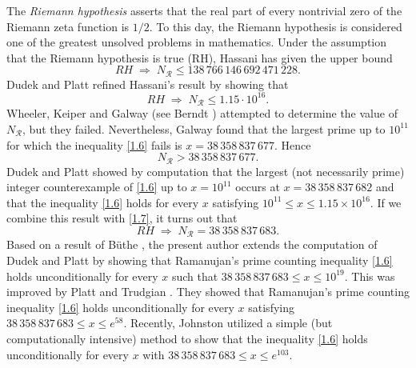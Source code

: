\documentclass[a4paper,12pt]{amsart}
\newcommand{\C}{\mathds{C}}
\theoremstyle{definition}
\theoremstyle{remark}
\begin{document}
The \textit{Riemann hypothesis} asserts that the real part of every nontrivial zero of the Riemann zeta function is $1/2$.
To this day, the Riemann hypothesis is considered one of the greatest unsolved problems in mathematics.
Under the assumption that the Riemann hypothesis is 
true (RH), Hassani \cite[Theorem 1.2]{hassani2012} has given the upper bound 
\begin{displaymath}
RH \; \Rightarrow \; N_{\mathcal{R}} \leq 138\,766\,146\,692\,471\,228.
\end{displaymath}
Dudek and Platt \cite[Lemma 3.2]{dudekplatt} refined Hassani's result by showing that
\begin{equation}
RH \; \Rightarrow \; N_{\mathcal{R}} \leq 1.15 \cdot 10^{16}. \tag{1.7} \label{1.7}
\end{equation}
Wheeler, Keiper and Galway (see Berndt \cite[p.]{berndt1994}) attempted to determine the value of $N_{\mathcal{R}}$, but they failed. Nevertheless, Galway found that 
the largest prime up to $10^{11}$ for which the inequality \eqref{1.6} fails is $x=38\,358\,837\,677$. Hence
\begin{displaymath}
N_{\mathcal{R}} > 38\,358\,837\,677.
\end{displaymath}
Dudek and Platt \cite[Theorem 1.3]{dudekplatt} showed by computation that the largest (not necessarily prime) integer counterexample of \eqref{1.6} up to $x = 10^{11}$ occurs at $x = 38\,358\,837\,682$ and that the inequality \eqref{1.6} holds for every $x$ satisfying $10^{11} \leq x \leq 1.15 \times 10^{16}$. If we combine this result with \eqref{1.7}, it turns out that
\begin{displaymath}
RH \; \Rightarrow \; N_{\mathcal{R}} = 38\,358\,837\,683.
\end{displaymath}
Based on a result of Büthe \cite[Theorem 2]{buethe}, the present author \cite[Theorem 3]{axler} extends the computation of Dudek and Platt by showing that Ramanujan's prime counting inequality \eqref{1.6} holds unconditionally for every $x$ such that $38\,358\,837\,683 \leq x \leq 10^{19}$. This was improved by Platt and Trudgian \cite[Theorem 2]{plattt}. They showed that Ramanujan's prime counting inequality \eqref{1.6} holds unconditionally for every $x$ satisfying $38\,358\,837\,683 \leq x \leq e^{58}$. Recently, Johnston \cite[Theorem 5.1]{johnston} utilized a simple (but computationally intensive) method to show that the inequality \eqref{1.6} holds unconditionally for every $x$ with $38\,358\,837\,683 \leq x \leq e^{103}$.
\end{document}
